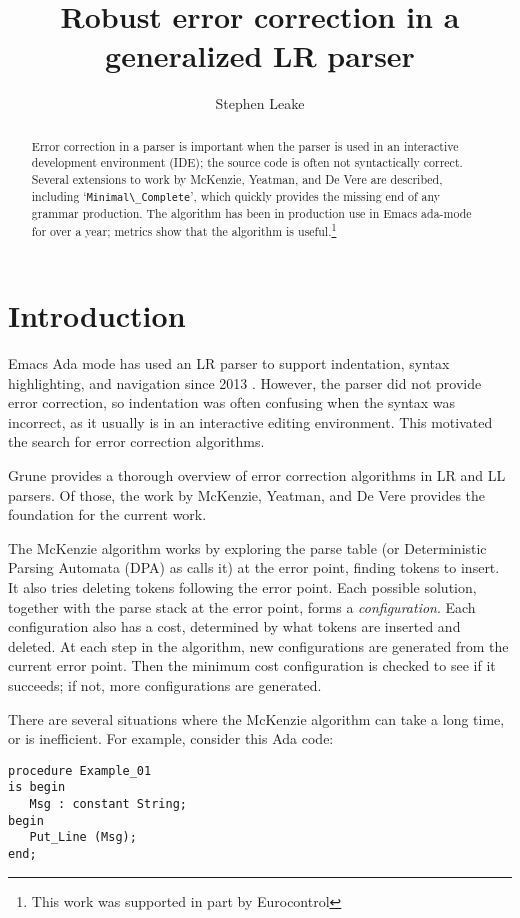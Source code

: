 \documentclass{article}
\title{Robust error correction in a generalized LR parser}
\author{Stephen Leake}
\newcommand{\code}[1]{`\lstinline|#1|'}
\begin{document}
\maketitle
\begin{abstract}
Error correction in a parser is important when the parser is used in
an interactive development environment (IDE); the source code is often not
syntactically correct. Several extensions to work by McKenzie, Yeatman,
and De Vere \cite{McKenzie 1995} are described, including
\code{Minimal\_Complete}, which quickly provides the missing end of
any grammar production. The algorithm has been in production use in
Emacs ada-mode for over a year; metrics show that the algorithm is
useful.\footnote{This work was supported in part by Eurocontrol}
\end{abstract}

\section{Introduction}
Emacs Ada mode has used an LR parser to support indentation, syntax
highlighting, and navigation since 2013 \cite{Emacs Ada mode news}.
However, the parser did not provide error correction, so indentation
was often confusing when the syntax was incorrect, as it usually is in
an interactive editing environment. This motivated the search for
error correction algorithms.

Grune \cite{Grune 2008} provides a thorough overview of error
correction algorithms in LR and LL parsers. Of those, the work by
McKenzie, Yeatman, and De Vere \cite{McKenzie 1995} provides the
foundation for the current work.

The McKenzie algorithm works by exploring the parse table (or
Deterministic Parsing Automata (DPA) as \cite{McKenzie 1995} calls it)
at the error point, finding tokens to insert. It also tries deleting
tokens following the error point. Each possible solution, together
with the parse stack at the error point, forms a
\textit{configuration}. Each configuration also has a cost, determined
by what tokens are inserted and deleted. At each step in the
algorithm, new configurations are generated from the current error
point. Then the minimum cost configuration is checked to see if it
succeeds; if not, more configurations are generated.

There are several situations where the McKenzie algorithm can take a
long time, or is inefficient. For example, consider this Ada code:
\begin{lstlisting}
procedure Example_01
is begin
   Msg : constant String;
begin
   Put_Line (Msg);
end;
\end{lstlisting}
\end{document}
